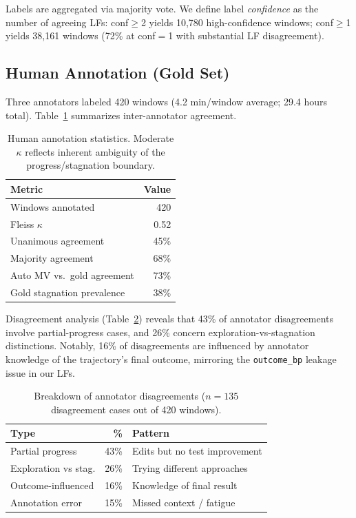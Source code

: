 \documentclass[11pt,a4paper]{article}
\begin{document}
Labels are aggregated via majority vote.
We define label \emph{confidence} as the number of agreeing LFs: conf${\geq}$2 yields 10,780 high-confidence windows; conf${\geq}$1 yields 38,161 windows (72\% at conf${=}$1 with substantial LF disagreement).

\subsection{Human Annotation (Gold Set)}
\label{sec:gold}

Three annotators labeled 420 windows (4.2 min/window average; 29.4 hours total).
Table~\ref{tab:human-annotation} summarizes inter-annotator agreement.

\begin{table}[t]
\centering
\small
\begin{tabular}{lr}
\toprule
\textbf{Metric} & \textbf{Value} \\
\midrule
Windows annotated & 420 \\
Fleiss $\kappa$ & 0.52 \\
Unanimous agreement & 45\% \\
Majority agreement & 68\% \\
Auto MV vs.\ gold agreement & 73\% \\
Gold stagnation prevalence & 38\% \\
\bottomrule
\end{tabular}
\caption{Human annotation statistics. Moderate $\kappa$ reflects inherent ambiguity of the progress/stagnation boundary.}
\label{tab:human-annotation}
\end{table}

Disagreement analysis (Table~\ref{tab:disagreement}) reveals that 43\% of annotator disagreements involve partial-progress cases, and 26\% concern exploration-vs-stagnation distinctions. Notably, 16\% of disagreements are influenced by annotator knowledge of the trajectory's final outcome, mirroring the \texttt{outcome\_bp} leakage issue in our LFs.

\begin{table}[t]
\centering
\small
\begin{tabular}{lrl}
\toprule
\textbf{Type} & \textbf{\%} & \textbf{Pattern} \\
\midrule
Partial progress & 43\% & Edits but no test improvement \\
Exploration vs stag. & 26\% & Trying different approaches \\
Outcome-influenced & 16\% & Knowledge of final result \\
Annotation error & 15\% & Missed context / fatigue \\
\bottomrule
\end{tabular}
\caption{Breakdown of annotator disagreements ($n{=}135$ disagreement cases out of 420 windows).}
\label{tab:disagreement}
\end{table}
\end{document}
